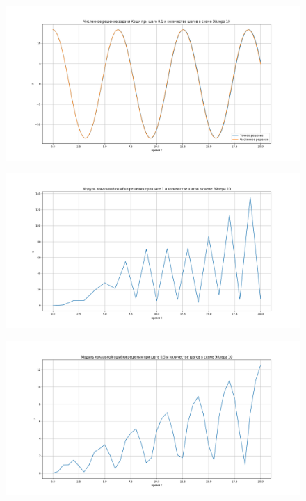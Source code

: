 \documentclass[diploma]{nanolab2015}
\begin{document}
\begin{figure}[h!]
\centering
\includegraphics[scale=0.5]{01 10.png}
\end{figure}

\begin{figure}[h!]
\centering
\includegraphics[scale=0.5]{err 1.png}
\end{figure}

\begin{figure}[h!]
\centering
\includegraphics[scale=0.5]{err 05.png}
\end{figure}
\end{document}

